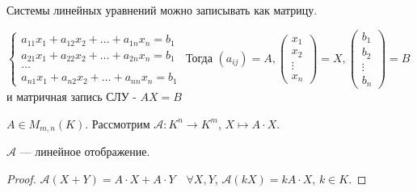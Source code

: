 \begin{example}[СЛУ]
    Системы линейных уравнений можно записывать как матрицу.

    $\begin{cases} a_{11}x_1 + a_{12}x_2 + \dots + a_{1n}x_n = b_1 \\ a_{21}x_1 + a_{22}x_2 + \dots + a_{2n}x_n = b_1 \\ \dots \\ a_{n1}x_1 + a_{n2}x_2 + \dots + a_{nn}x_n = b_1 \end{cases}$ Тогда $(a_{ij}) = A, \begin{pmatrix} x_1 \\ x_2 \\ \vdots \\ x_n \end{pmatrix} = X, \begin{pmatrix} b_1 \\ b_2 \\ \vdots \\ b_n \end{pmatrix} = B$ и матричная запись СЛУ - $AX = B$
\end{example}
\begin{remark}
    $A \in M_{m, n}(K)$. Рассмотрим  $\mathcal{A}\!: K^n \to K^m$,  $X \mapsto A \cdot X$.
\end{remark}
\begin{statement}
    $\mathcal{A}$ --- линейное отображение.
\end{statement}
\begin{proof}
    $\mathcal{A}(X+Y) = A \cdot X + A \cdot Y\quad \forall X, Y$,  $\mathcal{A}(kX) = kA\cdot X$,  $k \in K$.
\end{proof}

